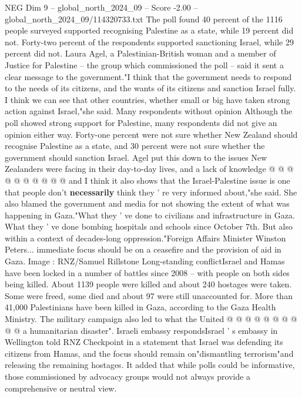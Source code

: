 \begin{textsample}{NEG Dim 9 – global\_north\_2024\_09 – Score -2.00 – global\_north\_2024\_09/114320733.txt}  \label{ex:f9_neg_211}
The poll found 40 percent of the 1116 people surveyed supported recognising Palestine as a state, while 19 percent did not.
Forty-two percent of the respondents supported sanctioning Israel, while 29 percent did not.
Laura Agel, a Palestinian-British woman and a member of Justice for Palestine -- the group which commissioned the poll -- said it sent a clear message to the government."I think that the government needs to respond to the needs of its citizens, and the wants of its citizens and sanction Israel fully.
I think we can see that other countries, whether small or big have taken strong action against Israel,"she said.
Many respondents without opinion Although the poll showed strong support for Palestine, many respondents did not give an opinion either way.
Forty-one percent were not sure whether New Zealand should recognise Palestine as a state, and 30 percent were not sure whether the government should sanction Israel.
Agel put this down to the issues New Zealanders were facing in their day-to-day lives, and a lack of knowledge @ @ @ @ @ @ @ @ @ @ and I think it also shows that the Israel-Palestine issue is one that people don't \textbf{necessarily} think they ' re very informed about,"she said.
She also blamed the government and media for not showing the extent of what was happening in Gaza."What they ' ve done to civilians and infrastructure in Gaza.
What they ' ve done bombing hospitals and schools since October 7th.
But also within a context of decades-long oppression."Foreign Affairs Minister Winston Peters... immediate focus should be on a ceasefire and the provision of aid in Gaza.
Image : RNZ/Samuel Rillstone Long-standing conflictIsrael and Hamas have been locked in a number of battles since 2008 -- with people on both sides being killed.
About 1139 people were killed and about 240 hostages were taken.
Some were freed, some died and about 97 were still unaccounted for.
More than 41,000 Palestinians have been killed in Gaza, according to the Gaza Health Ministry.
The military campaign also led to what the United @ @ @ @ @ @ @ @ @ @ a humanitarian disaster".
Israeli embassy respondsIsrael ' s embassy in Wellington told RNZ Checkpoint in a statement that Israel was defending its citizens from Hamas, and the focus should remain on"dismantling terrorism"and releasing the remaining hostages.
It added that while polls could be informative, those commissioned by advocacy groups would not always provide a comprehensive or neutral view.

\end{textsample}
